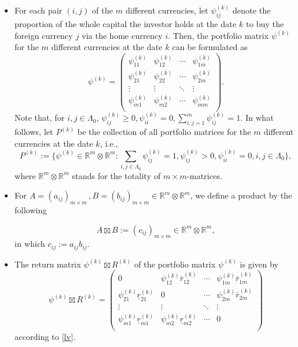 \documentclass[11pt]{article}
\numberwithin{equation}{section}
\begin{document}
\begin{itemize}
	\item For each pair $(i,j)$ of the $m$ different currencies,  let $\psi_{ij}^{(k)}$ denote the proportion of the whole capital the investor holds at the  date $k$ to buy the foreign 
	currency $j$ via the home currency $i$. Then, the  portfolio matrix $\psi^{(k)}$ for the $m$ different currencies at the  date $k$ can be formulated as 
	\begin{equation}\label{P1}
	\psi^{(k)}= \left(\begin{array}{ccccc}
	\psi_{11}^{(k)} & \psi_{12}^{(k)}&\cdots&\psi_{1m}^{(k)}\\
	\psi_{21}^{(k)} & \psi_{22}^{(k)}&\cdots&\psi_{2m}^{(k)}\\
	\vdots & \vdots&\ddots&\vdots\\
	\psi_{m1}^{(k)} & \psi_{m2}^{(k)}& \cdots&\psi_{mm}^{(k)}\\
	\end{array}
	\right).
	\end{equation}
Note that, for $i,j\in\Lambda_0$,  $\psi_{ij}^{(k)}\ge0,  \psi_{ii}^{(k)}=0, \sum_{i,j=1}^m\psi_{ij}^{(k)}=1$. In what follows,  let $P^{(k)}$ be the collection of all portfolio matrices 
for the $m$ different currencies   at the date $k$, i.e., 
	\begin{equation*} 
	P^{(k)}:=\Big\{\psi^{(k)}\in \mathbb{R}^m\otimes \mathbb{R}^m: \sum_{i,j\in\Lambda_0}\psi_{ij}^{(k)}=1,\psi_{ij}^{(k)} > 0, \psi_{ii}^{(k)}=0, i,j\in\Lambda_0\Big\},
	\end{equation*}
where $\mathbb{R}^m\otimes \mathbb{R}^m$	stands for the totality of $m\times m$-matrices. 

	\item For  $A=(a_{ij})_{m\times m}\, , B=(b_{ij})_{m\times m}\in \mathbb{R}^m\otimes \mathbb{R}^m$,  we define a product by the following  
	
	\begin{equation}\label{lv}
	A\boxtimes B:=(c_{ij})_{m\times m}\in \mathbb{R}^m\otimes \mathbb{R}^m, 
	\end{equation}
	in which $c_{ij}:=a_{ij}b_{ij}.$
	
	
	\item The return matrix $\psi^{(k)}\boxtimes R^{(k)}$ of the portfolio matrix $\psi^{(k)}$  is given by 
	\begin{equation*}
	\psi^{(k)}\boxtimes R^{(k)}=\left(\begin{array}{ccccc}
	0 & \psi_{12}^{(k)}\bar r_{12}^{(k)}&\cdots&\psi_{1m}^{(k)} \bar r_{1m}^{(k)}\\
	\psi_{21}^{(k)}\underline r_{21}^{(k)} & 0&\cdots&\psi_{2m}^{(k)}\bar r_{2m}^{(k)}\\
	\vdots & \vdots&\ddots&\vdots\\
	\psi_{m1}^{(k)}\underline r_{m1}^{(k)} & \psi_{m2}^{(k)}\underline r_{m2}^{(k)}&\cdots&0\\
	\end{array}
	\right)
	\end{equation*}
	according to \eqref{lv}. 


\end{itemize}
\end{document}
